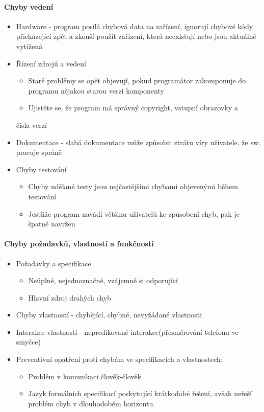 \paragraph{Chyby vedení}
\begin{itemize}[itemsep=0px]
\item Hardware - program posílá chybová data na zařízení, ignorují chybové kódy přicházející zpět a zkouší použít zařízení, která neexistují nebo jsou aktuálně vytížená
\item Řízení zdrojů a vedení
    \begin{itemize}[itemsep=0px]
    \item Staré problémy se opět objevují, pokud programátor zakomponuje do programu nějakou starou verzi komponenty
    \item Ujistěte se, že program má správný copyright, vstupní obrazovky a
    \end{itemize}čísla verzí
\item Dokumentace - slabá dokumentace může způsobit ztrátu víry uživatele, že sw. pracuje spráně
\item Chyby testování
    \begin{itemize}[itemsep=0px]
    \item Chyby udělané testy jsou nejčastějšími chybami objevenými během testování
    \item Jestliže program navádí většinu uživatelů ke způsobení chyb, pak je špatně navržen
    \end{itemize}
\end{itemize}
    
\paragraph{Chyby požadavků, vlastností a funkčnosti}

\begin{itemize}[itemsep=0px]
\item Požadavky a specifikace
    \begin{itemize}[itemsep=0px]
    \item Neúplné, nejednoznačné, vzájemně si odporující
    \item Hlavní zdroj drahých chyb
    \end{itemize}
\item Chyby vlastností - chybějící, chybné, nevyžádané vlastnosti
\item Interakce vlastností - nepredikované interakce(přesměrování telefonu ve smyčce)
\item Preventivní opatření proti chybám ve specifikacích a vlastnostech:
    \begin{itemize}[itemsep=0px]
    \item Problém v komunikaci člověk-člověk
    \item Jazyk formálních specifikací poskytující krátkodobé řešení, avšak neřeší problém chyb v dlouhodobém horizontu.
    \end{itemize}
\end{itemize}
    
